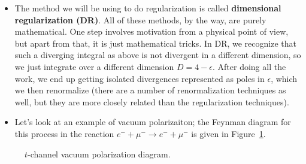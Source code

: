 \begin{itemize}
    \item The method we will be using to do regularization is called \textbf{dimensional regularization (DR)}. All of these methods, by the way, are purely mathematical. One step involves motivation from a physical point of view, but apart from that, it is just mathematical tricks. In DR, we recognize that such a diverging integral as above is not divergent in a different dimension, so we just integrate over a different dimension $D=4-\epsilon$. After doing all the work, we end up getting isolated divergences represented as poles in $\epsilon$, which we then renormalize (there are a number of renormalization techniques as well, but they are more closely related than the regularization techniques).
    \item Let's look at an example of vacuum polarizaiton; the Feynman diagram for this process in the reaction $e^- + \mu^- \rightarrow e^- + \mu^-$ is given in Figure~\ref{fig:VacuumPolarizationDiagram}.
\end{itemize}


\begin{figure}[ht]
    \centering
    

    \caption{$t$-channel vacuum polarization diagram.}
    \label{fig:VacuumPolarizationDiagram}
\end{figure}

